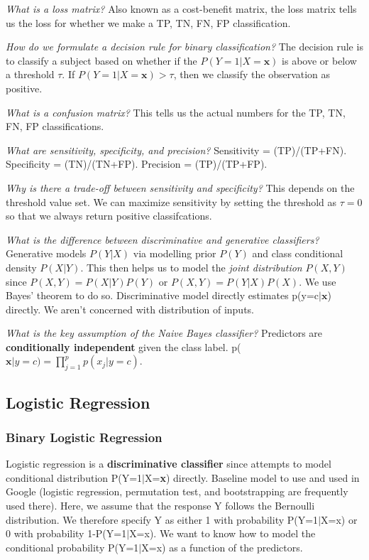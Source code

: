 \documentclass[11pt, oneside]{article}
\theoremstyle{definition}
\begin{document}
\textit{What is a loss matrix?} Also known as a cost-benefit matrix, the loss matrix tells us the loss for whether we make a TP, TN, FN, FP classification.

\textit{How do we formulate a decision rule for binary classification?}
The decision rule is to classify a subject based on whether if the $P(Y=1|X=\bm{x})$ is above or below a threshold $\tau$. If $P(Y=1|X=\bm{x}) > \tau$, then we classify the observation as positive.

\textit{What is a confusion matrix?} This tells us the actual numbers for the TP, TN, FN, FP classifications.

\textit{What are sensitivity, specificity, and precision?}
Sensitivity = (TP)/(TP+FN). Specificity = (TN)/(TN+FP). Precision = (TP)/(TP+FP).

\textit{Why is there a trade-off between sensitivity and specificity?} This depends on the threshold value set. We can maximize sensitivity by setting the threshold as $\tau = 0$ so that we always return positive classifcations.

\textit{What is the difference between discriminative and generative classifiers?} Generative models $P(Y|X)$ via modelling prior $P(Y)$ and class conditional density $P(X|Y)$. This then helps us to model the \textit{joint distribution} $P(X,Y)$ since $P(X,Y) = P(X|Y)P(Y)$ or $P(X,Y) = P(Y|X)P(X)$. We use Bayes' theorem to do so. Discriminative model directly estimates p(y=c$|\bm{x}$) directly. We aren't concerned with distribution of inputs.

\textit{What is the key assumption of the Naive Bayes classifier?} Predictors are \textbf{conditionally independent} given the class label. p($\bm{x}|y=c) = \prod\limits_{j=1}^pp(x_j|y=c)$.
\subsection{Logistic Regression}
\subsubsection{Binary Logistic Regression}
Logistic regression is a \textbf{discriminative classifier} since attempts to model conditional distribution P(Y=1$|$X=\textbf{x}) directly. Baseline model to use and used in Google (logistic regression, permutation test, and bootstrapping are frequently used there). Here, we assume that the response Y follows the Bernoulli distribution. We therefore specify Y as either 1 with probability P(Y=1$|$X=x) or 0 with probability 1-P(Y=1$|$X=x). We want to know how to model the conditional probability P(Y=1$|$X=x) as a function of the predictors.
\end{document}
